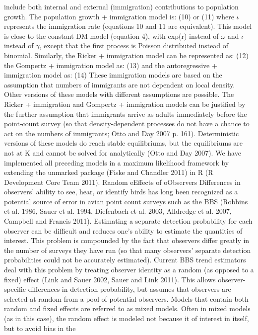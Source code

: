 \documentclass[12pt]{article}
\begin{document}
include both internal and external (immigration) contributions
to population growth.  The population growth + immigration
model is:
(10)
or
(11)
where $\iota$ represents the immigration rate (equations 10 and 11 are
equivalent).  This model is close to the constant DM model (equation
4), with exp(r) instead of $\omega$ and $\iota$ instead of $\gamma$, except that the first
process is Poisson distributed instead of binomial.  Similarly, the
Ricker + immigration model can be represented as:
(12)
the Gompertz + immigration model as:
(13)
and the autoregressive + immigration model as:
(14)
These immigration models are based on the assumption that numbers
of immigrants are not dependent on local density.  Other versions
of these models with different assumptions are possible. The
Ricker + immigration and Gompertz + immigration models can be
justified by the further assumption that immigrants arrive as
adults immediately before the point-count survey (so that
density-dependent processes do not have a chance to act on the
numbers of immigrants; Otto and Day 2007 p. 161).  Deterministic
versions of these models do reach stable equilibriums, but the
equilibriums are not at K and cannot be solved for analytically
(Otto and Day 2007).  We have implemented all preceding models in
a maximum likelihood framework by extending the unmarked package
(Fiske and Chandler 2011) in R (R Development Core Team 2011).
Random eEffects of oObservers
Differences in observers' ability to see, hear, or identify
birds has long been recognized as a potential source of error
in avian point count surveys such as the BBS (Robbins et
al. 1986, Sauer et al. 1994, Diefenbach et al. 2003, Alldredge
et al. 2007, Campbell and Francis 2011).  Estimating a
separate detection probability for each observer can be
difficult and reduces one's ability to estimate the quantities
of interest.  This problem is compounded by the fact that
observers differ greatly in the number of surveys they have
run (so that many observers' separate detection probabilities
could not be accurately estimated).
Current BBS trend estimators deal with this problem by
treating observer identity as a random (as opposed to a fixed)
effect (Link and Sauer 2002, Sauer and Link 2011).  This
allows observer-specific differences in detection probability,
but assumes that observers are selected at random from a pool
of potential observers.  Models that contain both random and
fixed effects are referred to as mixed models.  Often in mixed
models (as in this case), the random effect is modeled not
because it of interest in itself, but to avoid bias in the
\end{document}
